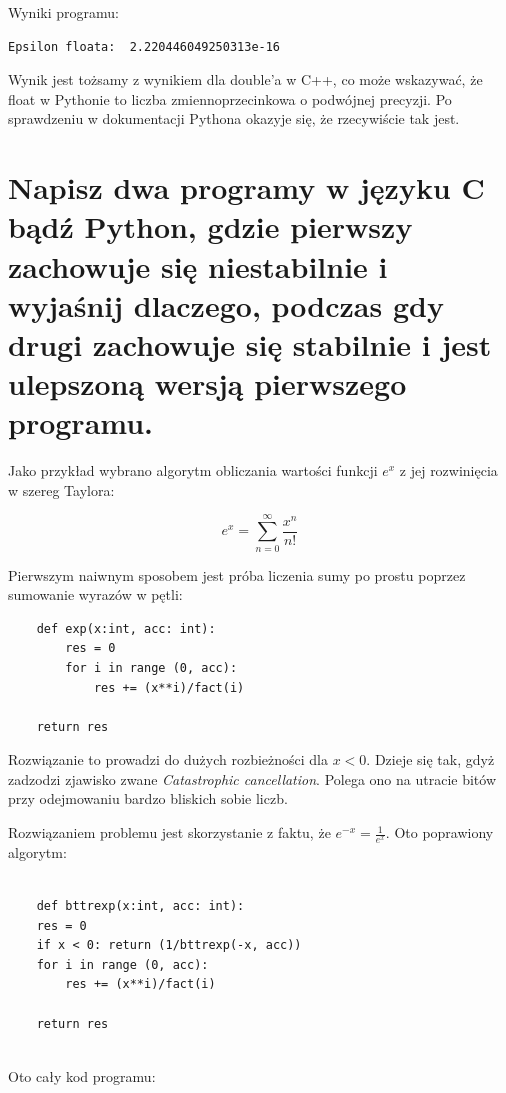 \documentclass{article}
\begin{document}
Wyniki programu:

\begin{lstlisting}
Epsilon floata:  2.220446049250313e-16
\end{lstlisting}

Wynik jest tożsamy z wynikiem dla double'a w C++, co może wskazywać, że float w Pythonie to liczba zmiennoprzecinkowa o podwójnej precyzji. Po sprawdzeniu w dokumentacji Pythona okazyje się, że rzecywiście tak jest.

\clearpage
\newpage
\section{Napisz dwa programy w języku C bądź Python, gdzie pierwszy zachowuje się niestabilnie i wyjaśnij dlaczego, podczas gdy drugi zachowuje się stabilnie i jest ulepszoną wersją pierwszego programu.
}

Jako przykład wybrano algorytm obliczania wartości funkcji $e^x$ z jej rozwinięcia w szereg Taylora:

$$
e^x = \sum_{n = 0}^\infty {\frac{x^n}{n!}}
$$



Pierwszym naiwnym sposobem jest próba liczenia sumy po prostu poprzez sumowanie wyrazów w pętli:

\begin{verbatim}
	def exp(x:int, acc: int):
    	res = 0
    	for i in range (0, acc):
       		res += (x**i)/fact(i)

    return res
\end{verbatim}

Rozwiązanie to prowadzi do dużych rozbieżności dla $x<0$.  Dzieje się tak, gdyż zadzodzi zjawisko zwane \textit{Catastrophic cancellation}. Polega ono na utracie bitów przy odejmowaniu bardzo bliskich sobie liczb.

Rozwiązaniem problemu jest skorzystanie z faktu, że $e^{-x} = \frac{1}{e^x}$. Oto poprawiony algorytm:

\begin{verbatim}

	def bttrexp(x:int, acc: int):
	res = 0
	if x < 0: return (1/bttrexp(-x, acc))
	for i in range (0, acc):
		res += (x**i)/fact(i)
		
	return res
	
\end{verbatim}
\newpage

Oto cały kod programu:
\end{document}
